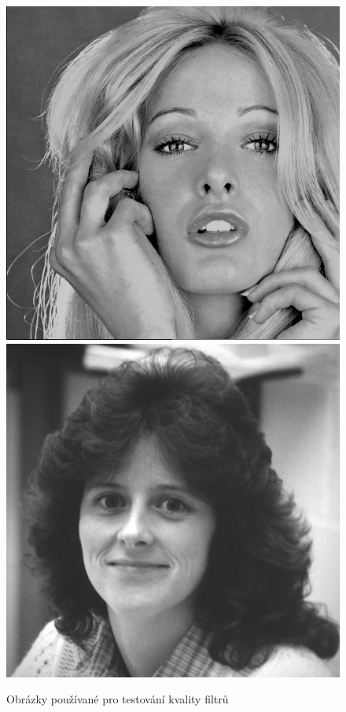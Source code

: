 \begin{figure}[h!]
    \includegraphics[width=\size]{fig/testimages/woman_blonde.png}\hfill
    \includegraphics[width=\size]{fig/testimages/woman_darkhair.png}
    \caption{Obrázky používané pro testování kvality filtrů}
    \label{obrTestovaci}
\end{figure}

